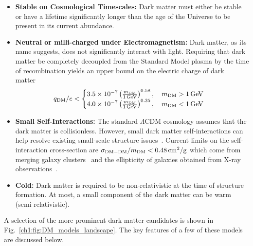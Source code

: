 \begin{itemize}
    \item \textbf{Stable on Cosmological Timescales:} Dark matter must either be stable or have a lifetime significantly longer than the age of the Universe to be present in its current abundance. 
    
    \item \textbf{Neutral or milli-charged under Electromagnetism:} Dark matter, as its name suggests, does not significantly interact with light. Requiring that dark matter be completely decoupled from the Standard Model plasma by the time of recombination yields an upper bound on the electric charge of dark matter~\cite{McDermott:2010pa_TurningLightsHow} 
    \begin{equation}
        q_\mathrm{DM}/e < \begin{cases}
            3.5\times10^{-7} \left( \frac{m_\mathrm{DM}}{1{\rm \,GeV}}\right)^{0.58},\quad m_\mathrm{DM} > 1{\rm \,GeV}\\
            4.0\times 10^{-7}\left( \frac{m_\mathrm{DM}}{1{\rm \,GeV}}\right)^{0.35},\quad m_\mathrm{DM} <1{\rm \,GeV}
        \end{cases}
    \end{equation}
    
    \item \textbf{Small Self-Interactions:} The standard $\Lambda$CDM cosmology assumes that the dark matter is collisionless. However, small dark matter self-interactions can help resolve existing small-scale structure issues~\cite{Tulin:2017ara_feb_DarkMatterSelfinteractions, Spergel:1999mh_Observationalevidenceselfinteracting}. Current limits on the self-interaction cross-section are $\sigma_{\mathrm{DM-DM}}/m_\mathrm{DM} < 0.48{\rm \,cm}^2/\mathrm{g}$ which come from merging galaxy clusters~\cite{Randall:2008ppe_ConstraintsSelfInteractionCrossSection} and the ellipticity of galaxies obtained from X-ray observations~\cite{Buote:2002wd_ChandraEvidenceFlattened}.

    \item \textbf{Cold:} Dark matter is required to be non-relativistic at the time of structure formation. At most, a small component of the dark matter can be warm (semi-relativistic).
\end{itemize}
A selection of the more prominent dark matter candidates is shown in Fig.~\ref{ch1:fig:DM_models_landscape}. The key features of a few of these models are discussed below.

